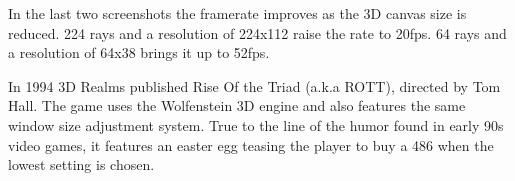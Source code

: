    \begin{figure}[H]
\centering
 \end{figure}
 \par
 In the last two screenshots the framerate improves as the 3D canvas size is reduced. 224 rays and a resolution of 224x112 raise the rate to 20fps. 64 rays and a resolution of 64x38 brings it up to 52fps.\\
 \par
{} In 1994 3D Realms published Rise Of the Triad (a.k.a ROTT), directed by Tom Hall. The game uses the Wolfenstein 3D engine and also features the same window size adjustment system. True to the line of the humor found in early 90s video games, it features an easter egg teasing the player to buy a 486 when the lowest setting is chosen.
    \begin{figure}[H]
\centering
 \end{figure}
 \par
